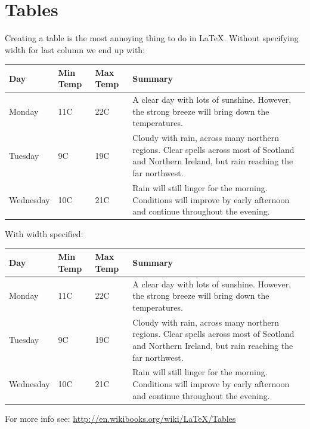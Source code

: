 \documentclass[a4paper,12pt]{article}
\begin{document}
\section{Tables}
Creating a table is the most annoying thing to do in {\LaTeX}.
Without specifying width for last column we end up with:

\begin{center}
     \begin{tabular}{| l | l | l | l |}
     \hline
     Day & Min Temp & Max Temp & Summary \\ \hline
     Monday & 11C & 22C & A clear day with lots of sunshine.
     However, the strong breeze will bring down the temperatures. \\ \hline
     Tuesday & 9C & 19C & Cloudy with rain, across many northern regions. Clear spells
     across most of Scotland and Northern Ireland,
     but rain reaching the far northwest. \\ \hline
     Wednesday & 10C & 21C & Rain will still linger for the morning.
     Conditions will improve by early afternoon and continue
     throughout the evening. \\
     \hline
     \end{tabular}
\end{center}

With width specified:
 
\begin{center}
     \begin{tabular}{ | l | l | l | p{5cm} |}
     \hline
     Day & Min Temp & Max Temp & Summary \\ \hline
     Monday & 11C & 22C & A clear day with lots of sunshine.  
     However, the strong breeze will bring down the temperatures. \\ \hline
     Tuesday & 9C & 19C & Cloudy with rain, across many northern regions. Clear spells
     across most of Scotland and Northern Ireland,
     but rain reaching the far northwest. \\ \hline
     Wednesday & 10C & 21C & Rain will still linger for the morning.
     Conditions will improve by early afternoon and continue
     throughout the evening. \\
     \hline
     \end{tabular}
\end{center}



For more info see: \url{http://en.wikibooks.org/wiki/LaTeX/Tables}
\end{document}
